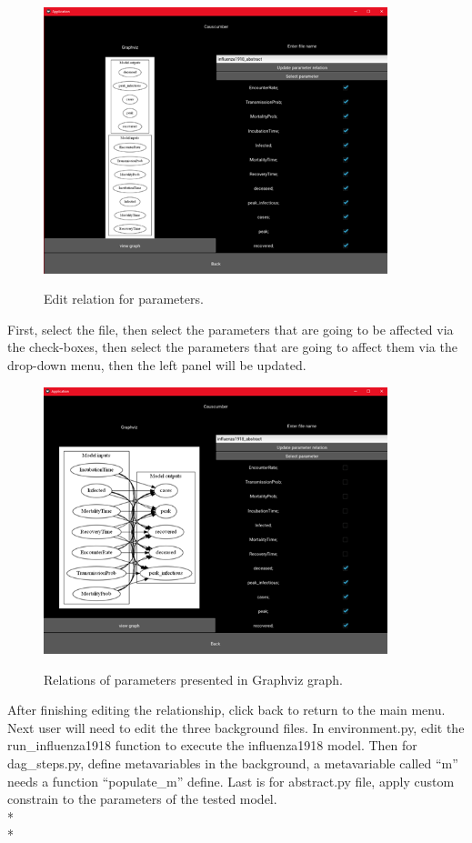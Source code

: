 \begin{figure}[H]
	\centering
	\includegraphics[width=10cm]{figures/influenzaTestProcess5.png}\\
	\caption{Edit relation for parameters.}
	\label{fig:figure23}
\end{figure}
First, select the file, then select the parameters that are going to be affected via the check-boxes, then select the parameters that are going to affect them via the drop-down menu, then the left panel will be updated.
\begin{figure}[H]
	\centering
	\includegraphics[width=10cm]{figures/influenzaTestProcess7.png}\\
	\caption{Relations of parameters presented in Graphviz graph.}
	\label{fig:figure25}
\end{figure}
After finishing editing the relationship, click back to return to the main menu.
Next user will need to edit the three background files. In environment.py, edit the run\_influenza1918 function to execute the influenza1918 model. Then for dag\_steps.py, define metavariables in the background, a metavariable called “m” needs a function “populate\_m” define. Last is for abstract.py file, apply custom constrain to the parameters of the tested model. \\*\\*
